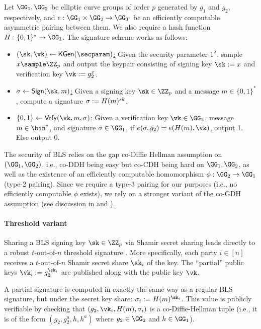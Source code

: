 \begin{construction}\label{con:bls}
Let $\GG_1, \GG_2$ be elliptic curve groups of order $p$ generated by $g_1$ and $g_2$, respectively, and $e: \GG_1 \times \GG_2 \rightarrow \GG_T$ be an efficiently computable asymmetric pairing between them. We also require a hash function $\blshash: \{0, 1\}^* \rightarrow \GG_1$. The signature scheme works as follows:
\begin{itemize}
\item \underline{$(\sk, \vk) \gets \kgen(\secparam)$:} Given the security parameter $1^\lambda$, sample $x \sample \ZZ_p$ and output the keypair consisting of signing key $\sk := x$ and verification key $\vk := g_2^x$.
\item \underline{$\sigma \gets \sign(\sk, m)$:} Given a signing key $\sk \in \ZZ_p$ and a message $m \in \{0,1\}^*$, compute a signature $\sigma := H(m)^{sk}$.
\item \underline{$\{0,1\} \gets \vrfy(\vk, m, \sigma)$:} Given a verification key $\vk \in \GG_2$, message $m \in \bin^*$, and signature $\sigma \in \GG_1$, if $e(\sigma, g_2) = e(\blshash(m), \vk)$, output 1. Else output 0.
\end{itemize}
\end{construction}

The security of BLS relies on the gap co-Diffie Hellman assumption on $(\GG_1,\GG_2)$, i.e., co-DDH being easy but co-CDH being hard on $\GG_1,\GG_2$, as well as the existence of an efficiently computable homomorphism $\phi: \GG_2 \rightarrow \GG_1$ (type-2 pairing). Since we require a type-3 pairing for our purposes (i.e., no efficiently computable $\phi$ exists), we rely on a stronger variant of the co-GDH assumption (see discussion in \cite[\S3.1]{AC:BonLynSha01} and \cite[\S2.2]{EPRINT:SmaVer05}).

\paragraph{Threshold variant}
Sharing a BLS signing key $\sk \in \ZZ_p$ via Shamir secret sharing leads directly to a robust $t$-out-of-$n$ threshold signature \cite{AC:BonLynSha01}.
More specifically, each party $i \in [n]$ receives a $t$-out-of-$n$ Shamir secret share $\sk_i$ of the key. The ``partial'' public keys $\vk_i := g_2^{\sk_i}$ are published along with the public key $\vk$.

A partial signature is computed in exactly the same way as a regular BLS signature, but under the secret key share: $\sigma_i := \blshash(m)^{\sk_i}$. This value is publicly verifiable by checking that $(g_2, \vk_i, \blshash(m), \sigma_i)$ is a co-Diffie-Hellman tuple (i.e., it is of the form $(g_2, g_2^a, h, h^a)$ where $g_2 \in \GG_2$ and $h \in \GG_1$).

